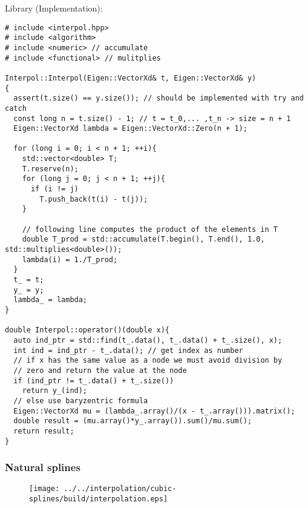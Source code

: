 \documentclass[a4paper]{article}
\begin{document}
Library (Implementation):
\begin{verbatim}
# include <interpol.hpp>
# include <algorithm>
# include <numeric> // accumulate
# include <functional> // mulitplies

Interpol::Interpol(Eigen::VectorXd& t, Eigen::VectorXd& y)
{
  assert(t.size() == y.size()); // should be implemented with try and catch
  const long n = t.size() - 1; // t = t_0,... ,t_n -> size = n + 1
  Eigen::VectorXd lambda = Eigen::VectorXd::Zero(n + 1);

  for (long i = 0; i < n + 1; ++i){
    std::vector<double> T;
    T.reserve(n);
    for (long j = 0; j < n + 1; ++j){
      if (i != j)
        T.push_back(t(i) - t(j)); 
    }

    // following line computes the product of the elements in T
    double T_prod = std::accumulate(T.begin(), T.end(), 1.0, std::multiplies<double>());
    lambda(i) = 1./T_prod;
  }
  t_ = t;
  y_ = y;
  lambda_ = lambda;
}

double Interpol::operator()(double x){
  auto ind_ptr = std::find(t_.data(), t_.data() + t_.size(), x);
  int ind = ind_ptr - t_.data(); // get index as number
  // if x has the same value as a node we must avoid division by 
  // zero and return the value at the node
  if (ind_ptr != t_.data() + t_.size())
    return y_(ind);
  // else use baryzentric formula
  Eigen::VectorXd mu = (lambda_.array()/(x - t_.array())).matrix();
  double result = (mu.array()*y_.array()).sum()/mu.sum();
  return result;
}
\end{verbatim}

\subsubsection{Natural splines}

\begin{figure}[h]
  \centering
  \texttt{[image: ../../interpolation/cubic-splines/build/interpolation.eps]}
\end{figure}
\end{document}
